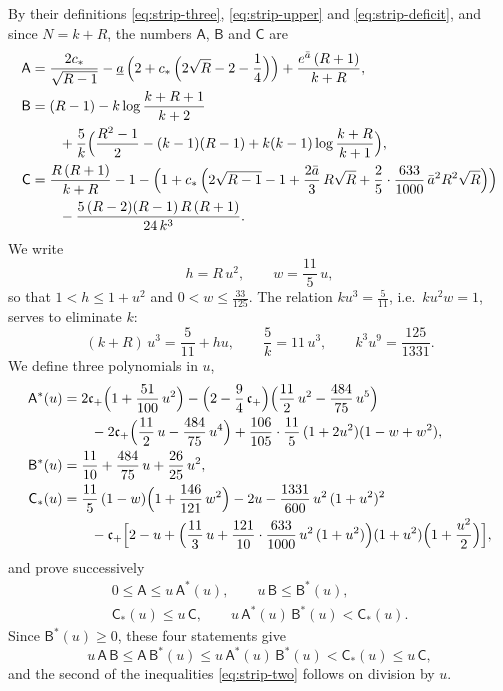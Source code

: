 \documentclass{amsart}
\theoremstyle{definition}
\theoremstyle{remark}
\numberwithin{equation}{section}
\begin{document}
By their definitions \eqref{eq:strip-three}, \eqref{eq:strip-upper} and \eqref{eq:strip-deficit}, and since $N=k+R$, the numbers $\mathsf{A}$, $\mathsf{B}$ and $\mathsf{C}$ are
\begin{align*}
\mathsf{A}&=\frac{2c_\ast}{\sqrt{R-1}}-\underline a\,\Bigl(2+c_\ast\,\Bigl(2\sqrt R-2-\frac14\Bigr)\Bigr)+\frac{e^{\bar a}\,(R+1)}{k+R},\\
\mathsf{B}&=(R-1)-k\log\frac{k+R+1}{k+2}\\
&\qquad+\frac5k\Bigl(\frac{R^2-1}{2}-(k-1)(R-1)+k(k-1)\log\frac{k+R}{k+1}\Bigr),\\
\mathsf{C}&=\frac{R\,(R+1)}{k+R}-1-\Bigl(1+c_\ast\,\Bigl(2\sqrt{R-1}-1+\frac{2\bar a}{3}\,R\sqrt R+\frac25\cdot\frac{633}{1000}\,\bar a^{2}R^{2}\sqrt R\Bigr)\Bigr)\\
&\qquad-\frac{5\,(R-2)(R-1)\,R\,(R+1)}{24\,k^{3}}.
\end{align*}
We write
\[
h=R\,u^2,\qquad w=\frac{11}{5}\,u,
\]
so that $1<h\le 1+u^2$ and $0<w\le\frac{33}{125}$. The relation $ku^3=\frac{5}{11}$, i.e.\ $ku^2w=1$, serves to eliminate $k$:
\[
(k+R)\,u^3=\frac{5}{11}+hu,\qquad\frac5k=11\,u^3,\qquad k^3u^9=\frac{125}{1331}.
\]
We define three polynomials in $u$,
\begin{align*}
\mathsf{A}^{*}(u)&=2\mathfrak{c}_+\Bigl(1+\frac{51}{100}\,u^2\Bigr)-\Bigl(2-\frac94\,\mathfrak{c}_+\Bigr)\Bigl(\frac{11}{2}\,u^2-\frac{484}{75}\,u^5\Bigr)\\
&\qquad-2\mathfrak{c}_+\Bigl(\frac{11}{2}\,u-\frac{484}{75}\,u^4\Bigr)+\frac{106}{105}\cdot\frac{11}{5}\,(1+2u^2)(1-w+w^2),\\
\mathsf{B}^{*}(u)&=\frac{11}{10}+\frac{484}{75}\,u+\frac{26}{25}\,u^2,\\
\mathsf{C}_{*}(u)&=\frac{11}{5}\,(1-w)\Bigl(1+\frac{146}{121}\,w^2\Bigr)-2u-\frac{1331}{600}\,u^2\,(1+u^2)^2\\
&\qquad-\mathfrak{c}_+\Bigl[2-u+\Bigl(\frac{11}{3}\,u+\frac{121}{10}\cdot\frac{633}{1000}\,u^2\,(1+u^2)\Bigr)(1+u^2)\Bigl(1+\frac{u^2}{2}\Bigr)\Bigr],
\end{align*}
and prove successively
\[
\begin{gathered}
0\le\mathsf{A}\le u\,\mathsf{A}^{*}(u),\qquad u\,\mathsf{B}\le\mathsf{B}^{*}(u),\\
\mathsf{C}_{*}(u)\le u\,\mathsf{C},\qquad u\,\mathsf{A}^{*}(u)\,\mathsf{B}^{*}(u)<\mathsf{C}_{*}(u).
\end{gathered}
\]
Since $\mathsf{B}^{*}(u)\ge 0$, these four statements give
\[
u\,\mathsf{A}\,\mathsf{B}\le\mathsf{A}\,\mathsf{B}^{*}(u)\le u\,\mathsf{A}^{*}(u)\,\mathsf{B}^{*}(u)<\mathsf{C}_{*}(u)\le u\,\mathsf{C},
\]
and the second of the inequalities \eqref{eq:strip-two} follows on division by $u$.
\end{document}
